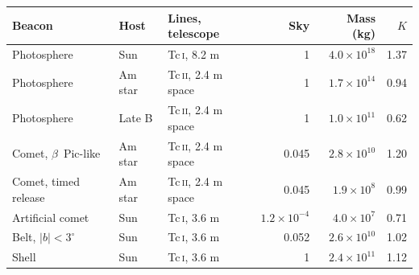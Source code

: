 \begin{tabular}{lllrrr}
\toprule
Beacon & Host & Lines, telescope & Sky & Mass (kg) & $K$ \\
\midrule
Photosphere & Sun & Tc\,\textsc{i}, 8.2 m & 1 & $4.0\times10^{18}$ & 1.37 \\
Photosphere & Am star & Tc\,\textsc{ii}, 2.4 m space & 1 & $1.7\times10^{14}$ & 0.94 \\
Photosphere & Late B & Tc\,\textsc{ii}, 2.4 m space & 1 & $1.0\times10^{11}$ & 0.62 \\
\addlinespace
Comet, $\beta$~Pic-like & Am star & Tc\,\textsc{ii}, 2.4 m space & 0.045 & $2.8\times10^{10}$ & 1.20 \\
Comet, timed release & Am star & Tc\,\textsc{ii}, 2.4 m space & 0.045 & $1.9\times10^{8}$ & 0.99 \\
\addlinespace
Artificial comet & Sun & Tc\,\textsc{i}, 3.6 m & $1.2\times10^{-4}$ & $4.0\times10^{7}$ & 0.71 \\
Belt, $|b| < 3^\circ$ & Sun & Tc\,\textsc{i}, 3.6 m & 0.052 & $2.6\times10^{10}$ & 1.02 \\
Shell & Sun & Tc\,\textsc{i}, 3.6 m & 1 & $2.4\times10^{11}$ & 1.12 \\
\bottomrule
\end{tabular}
